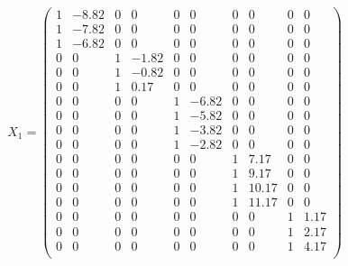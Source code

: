 \documentclass[final, paper=letter,5p,times,twocolumn]{elsarticle}
\theoremstyle{definition}
\begin{document}
$$
X_{1} = \left(
\begin{array}{cccccccccc}
        1  & -8.82      &       0&          0 &         0&          0&          0&          0&          0&      0 \\
        1  & -7.82      &       0&          0 &         0&          0&          0&          0&          0&      0 \\
        1  & -6.82      &       0&          0 &         0&          0&          0&          0&          0&      0 \\
        0  &        0   &       1&   -1.82    &         0&          0&          0&          0&          0&      0 \\
        0  &        0   &       1&  -0.82     &         0&          0&          0&          0&          0&      0 \\
        0  &        0   &       1&   0.17     &         0&          0&          0&          0&          0&      0 \\
        0  &        0   &       0&          0 &         1&   -6.82   &          0&          0&          0&      0 \\
        0  &        0   &       0&          0 &         1&   -5.82   &          0&          0&          0&      0 \\
        0  &        0   &       0&          0 &         1&   -3.82   &          0&          0&          0&      0 \\
        0  &        0   &       0&          0 &         1&   -2.82   &          0&          0&          0&      0 \\
        0  &        0   &       0&          0 &         0&          0&          1&    7.17   &          0&      0 \\
        0  &        0   &       0&          0 &         0&          0&          1&    9.17   &          0&      0 \\
        0  &        0   &       0&          0 &         0&          0&          1&    10.17  &          0&      0 \\
        0  &        0   &       0&          0 &         0&          0&          1&    11.17  &          0&      0 \\
        0  &        0   &       0&          0 &         0&          0&          0&          0&          1&    1.17 \\
        0  &        0   &       0&          0 &         0&          0&          0&          0&          1&    2.17 \\
        0  &        0   &       0&          0 &         0&          0&          0&          0&          1&    4.17 \\
\end{array}
\right)
$$
\end{document}
